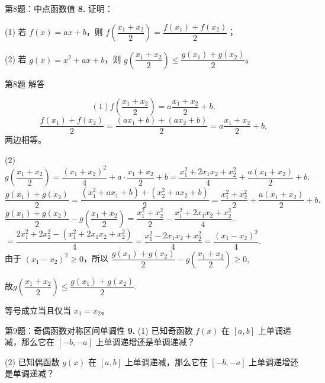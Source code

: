 \documentclass[10pt,aspectratio=169,serif,fleqn]{beamer}
\begin{document}
\begin{frame}[t]{第8题：中点函数值}
\textbf{8.} 证明：

(1) 若 $f(x)=ax+b$，则 $f\!\left(\dfrac{x_1+x_2}{2}\right)=\dfrac{f(x_1)+f(x_2)}{2}$；

(2) 若 $g(x)=x^2+ax+b$，则 $g\!\left(\dfrac{x_1+x_2}{2}\right)\le\dfrac{g(x_1)+g(x_2)}{2}$。
\end{frame}

\begin{frame}[t]{第8题 解答}\vspace{-2em}
\begin{tcolorbox}[colback=orange!10,colframe=orange,title=\textbf{证明}]
\[(1)
f\!\left(\frac{x_1+x_2}{2}\right)=a\frac{x_1+x_2}{2}+b,
\]
\[
\frac{f(x_1)+f(x_2)}{2}=\frac{(ax_1+b)+(ax_2+b)}{2}=a\frac{x_1+x_2}{2}+b,
\]
两边相等。

\end{tcolorbox}
\end{frame}

\begin{frame}
	
	\begin{tcolorbox}[colback=orange!10,colframe=orange,title=\textbf{证明}]
	(2)$g(\dfrac{x_1+x_2}{2})
	=\dfrac{(x_1+x_2)^2}{4}+a\cdot\dfrac{x_1+x_2}{2}+b
	=\dfrac{x_1^2+2x_1x_2+x_2^2}{4}+\dfrac{a(x_1+x_2)}{2}+b.$ \\[2pt]
		
	$\dfrac{g(x_1)+g(x_2)}{2}
	=\dfrac{(x_1^2+ax_1+b)+(x_2^2+ax_2+b)}{2}
	=\dfrac{x_1^2+x_2^2}{2}+\dfrac{a(x_1+x_2)}{2}+b.$ \\[2pt]
	
	$\dfrac{g(x_1)+g(x_2)}{2}-g\!\left(\dfrac{x_1+x_2}{2}\right)
	=\dfrac{x_1^2+x_2^2}{2}-\dfrac{x_1^2+2x_1x_2+x_2^2}{4}.$\\[2pt]
	
	$	=\dfrac{2x_1^2+2x_2^2-(x_1^2+2x_1x_2+x_2^2)}{4}
	=\dfrac{x_1^2-2x_1x_2+x_2^2}{4}
	=\dfrac{(x_1-x_2)^2}{4}.$\\[2pt]
	
	由于 \((x_1-x_2)^2\ge 0\)，所以
	$\dfrac{g(x_1)+g(x_2)}{2}-g\!\left(\dfrac{x_1+x_2}{2}\right)\ge 0,$
	
	故$	g\!\left(\dfrac{x_1+x_2}{2}\right)\le\dfrac{g(x_1)+g(x_2)}{2}.$
	
	
	等号成立当且仅当 \(x_1=x_2\)。
	\end{tcolorbox}
\end{frame}

\begin{frame}[t]{第9题：奇偶函数对称区间单调性}
\textbf{9.} (1) 已知奇函数 $f(x)$ 在 $[a,b]$ 上单调递减，那么它在 $[-b,-a]$ 上单调递增还是单调递减？

\vspace{0.5em}
(2) 已知偶函数 $g(x)$ 在 $[a,b]$ 上单调递减，那么它在 $[-b,-a]$ 上单调递增还是单调递减？
\end{frame}
\end{document}
